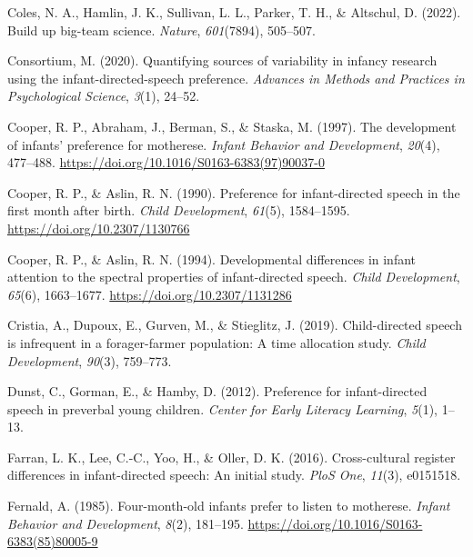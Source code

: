 \documentclass[
  ,man,floatsintext]{apa6}
\newlength{\cslhangindent}
\newlength{\cslentryspacingunit} %
\newenvironment{CSLReferences}[2] %
 {%
  \setlength{\parindent}{0pt}
  \ifodd #1
  \let\oldpar\par
  \def\par{\hangindent=\cslhangindent\oldpar}
  \fi
  \setlength{\parskip}{#2\cslentryspacingunit}
 }%
 {}
\begin{document}
\begin{CSLReferences}{1}{0}
\leavevmode{}%
Coles, N. A., Hamlin, J. K., Sullivan, L. L., Parker, T. H., \& Altschul, D. (2022). Build up big-team science. \emph{Nature}, \emph{601}(7894), 505--507.

\leavevmode{}%
Consortium, M. (2020). Quantifying sources of variability in infancy research using the infant-directed-speech preference. \emph{Advances in Methods and Practices in Psychological Science}, \emph{3}(1), 24--52.

\leavevmode{}%
Cooper, R. P., Abraham, J., Berman, S., \& Staska, M. (1997). The development of infants' preference for motherese. \emph{Infant Behavior and Development}, \emph{20}(4), 477--488. \url{https://doi.org/10.1016/S0163-6383(97)90037-0}

\leavevmode{}%
Cooper, R. P., \& Aslin, R. N. (1990). Preference for infant-directed speech in the first month after birth. \emph{Child Development}, \emph{61}(5), 1584--1595. \url{https://doi.org/10.2307/1130766}

\leavevmode{}%
Cooper, R. P., \& Aslin, R. N. (1994). Developmental differences in infant attention to the spectral properties of infant-directed speech. \emph{Child Development}, \emph{65}(6), 1663--1677. \url{https://doi.org/10.2307/1131286}

\leavevmode{}%
Cristia, A., Dupoux, E., Gurven, M., \& Stieglitz, J. (2019). Child-directed speech is infrequent in a forager-farmer population: A time allocation study. \emph{Child Development}, \emph{90}(3), 759--773.

\leavevmode{}%
Dunst, C., Gorman, E., \& Hamby, D. (2012). Preference for infant-directed speech in preverbal young children. \emph{Center for Early Literacy Learning}, \emph{5}(1), 1--13.

\leavevmode{}%
Farran, L. K., Lee, C.-C., Yoo, H., \& Oller, D. K. (2016). Cross-cultural register differences in infant-directed speech: An initial study. \emph{PloS One}, \emph{11}(3), e0151518.

\leavevmode{}%
Fernald, A. (1985). Four-month-old infants prefer to listen to motherese. \emph{Infant Behavior and Development}, \emph{8}(2), 181--195. \url{https://doi.org/10.1016/S0163-6383(85)80005-9}


\end{CSLReferences}
\end{document}
